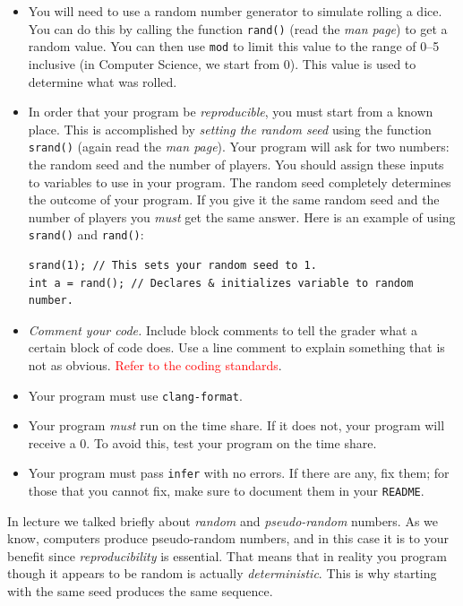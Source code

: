 \documentclass{article}
\begin{document}
\begin{itemize}
\item You will need to use a random number generator to simulate
rolling a dice. You can do this by calling the function \texttt{rand()}
(read the \emph{man page}) to get a random value. You can then use \texttt{mod}
to limit this value to the range of 0--5 inclusive (in Computer Science, we start from 0).
This value is used to determine what was rolled.

\item In order that your program be \emph{reproducible}, you must start from a
known place. This is accomplished by \emph{setting the random seed}
using the function \texttt{srand()} (again read the \emph{man page}).
Your program will ask for two numbers: the random seed and the
number of players. You should assign these inputs to variables to use
in your program. The random seed completely determines the outcome of your program. If you give it
the same random seed and the number of players you \emph{must} get
the same answer. Here is an example of using \texttt{srand()} and
\texttt{rand()}:
\begin{lstlisting}
srand(1); // This sets your random seed to 1.
int a = rand(); // Declares & initializes variable to random number.
\end{lstlisting}

\item \emph{Comment your code.} Include block comments to tell the grader what a certain block of code does. Use a line comment to explain something that is not as obvious. 
\textcolor{red}{Refer to the coding standards}.

\item Your program must use \texttt{clang-format}.

\item Your program \emph{must} run on the time share. If it does not, your program will receive a 0. To avoid this, test your program on the time share.

\item Your program must pass \texttt{infer} with no errors. If there are any, fix them; for those
that you cannot fix, make sure to document them in your \texttt{README}.

\end{itemize}

In lecture we talked briefly about \emph{random} and \emph{pseudo-random}
numbers. As we know, computers produce pseudo-random numbers,
and in this case it is to your benefit since \emph{reproducibility}
is essential. That means that in reality you program though it
appears to be random is actually \emph{deterministic}. This is why
starting with the same seed produces the same sequence.
\end{document}
